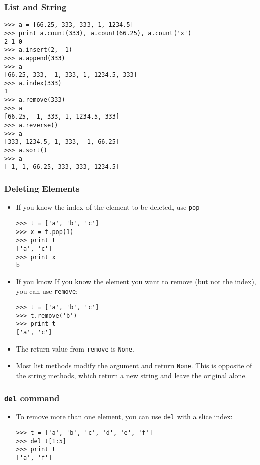 \documentclass{beamer}
\newcommand{\beforeverb}{\footnotesize}
\newcommand{\afterverb}{\normalsize}
\begin{document}
\begin{frame}[fragile]
\frametitle{List and String}
\begin{block}{}
\scriptsize
\begin{verbatim}
>>> a = [66.25, 333, 333, 1, 1234.5] 
>>> print a.count(333), a.count(66.25), a.count('x') 
2 1 0 
>>> a.insert(2, -1) 
>>> a.append(333) 
>>> a 
[66.25, 333, -1, 333, 1, 1234.5, 333] 
>>> a.index(333)
1
>>> a.remove(333) 
>>> a 
[66.25, -1, 333, 1, 1234.5, 333] 
>>> a.reverse() 
>>> a 
[333, 1234.5, 1, 333, -1, 66.25] 
>>> a.sort() 
>>> a 
[-1, 1, 66.25, 333, 333, 1234.5]
\end{verbatim}
\end{block}
\end{frame}

\begin{frame}[fragile]
\frametitle{Deleting Elements}
\begin{itemize}
\item If you know the index of the element to be deleted, use
{\tt pop}
\beforeverb
\begin{verbatim}
>>> t = ['a', 'b', 'c']
>>> x = t.pop(1)
>>> print t
['a', 'c']
>>> print x
b
\end{verbatim}
\afterverb
\item If you know If you know the element you want to remove (but not the index), you
can use {\tt remove}:
\beforeverb
\begin{verbatim}
>>> t = ['a', 'b', 'c']
>>> t.remove('b')
>>> print t
['a', 'c']
\end{verbatim}
\afterverb
\item The return value from {\tt remove} is {\tt None}. 
\item Most list methods \alert{modify the argument} and
  return {\tt None}. This is \alert{ opposite} of the string methods,
  which return a new string and leave the original alone.
\end{itemize}
\end{frame}
\begin{frame}[fragile]
\frametitle{{\tt del} command}
\begin{itemize}
\item To remove more than one element, you can use {\tt del} with
a slice index:
\beforeverb
\begin{verbatim}
>>> t = ['a', 'b', 'c', 'd', 'e', 'f']
>>> del t[1:5]
>>> print t
['a', 'f']
\end{verbatim}

\afterverb
%
\end{itemize}
\end{frame}
\end{document}
